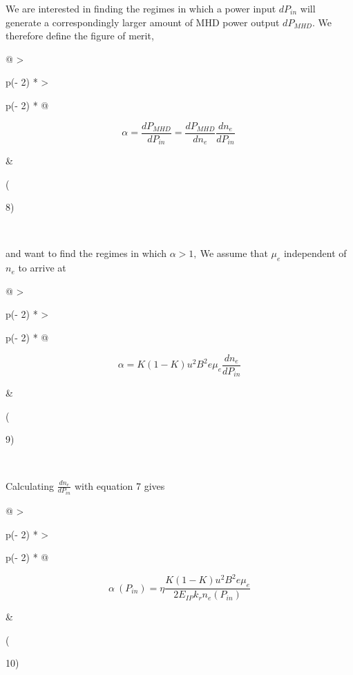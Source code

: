 We are interested in finding the regimes in which a power input \(dP_{in}\) will generate a correspondingly larger amount of MHD power output \(dP_{MHD}\). We therefore define the figure of merit,

\begin{longtable}[]{@{}
  >{\raggedright\arraybackslash}p{(\columnwidth - 2\tabcolsep) * }
  >{\raggedright\arraybackslash}p{(\columnwidth - 2\tabcolsep) * }@{}}
\toprule
\begin{minipage}[b]{\linewidth}\raggedright
\[\alpha = \frac{{dP}_{MHD}}{dP_{in}} = \frac{{dP}_{MHD}}{dn_{e}}\frac{dn_{e}}{dP_{in}}\ \]
\end{minipage} & \begin{minipage}[b]{\linewidth}\raggedright
(

8)
\end{minipage} \\
\midrule
\endhead
\bottomrule
\end{longtable}

and want to find the regimes in which \(\alpha > 1,\ \)We assume that \(\mu_{e}\) independent of \(n_{e}\) to arrive at

\begin{longtable}[]{@{}
  >{\raggedright\arraybackslash}p{(\columnwidth - 2\tabcolsep) * }
  >{\raggedright\arraybackslash}p{(\columnwidth - 2\tabcolsep) * }@{}}
\toprule
\begin{minipage}[b]{\linewidth}\raggedright
\[\alpha = K(1 - K)u^{2}B^{2}e\mu_{e}\frac{dn_{e}}{dP_{in}}\]
\end{minipage} & \begin{minipage}[b]{\linewidth}\raggedright
(

9)
\end{minipage} \\
\midrule
\endhead
\bottomrule
\end{longtable}

Calculating \(\frac{dn_{e}}{dP_{in}}\) with equation 7 gives

\begin{longtable}[]{@{}
  >{\raggedright\arraybackslash}p{(\columnwidth - 2\tabcolsep) * }
  >{\raggedright\arraybackslash}p{(\columnwidth - 2\tabcolsep) * }@{}}
\toprule
\begin{minipage}[b]{\linewidth}\raggedright
\[\alpha\ (P_{in}) = \eta\frac{K(1 - K)u^{2}B^{2}e\mu_{e}}{2E_{IP}k_{r}n_{e}(P_{in})}\]
\end{minipage} & \begin{minipage}[b]{\linewidth}\raggedright
(

10)
\end{minipage} \\
\midrule
\endhead
\bottomrule
\end{longtable}

